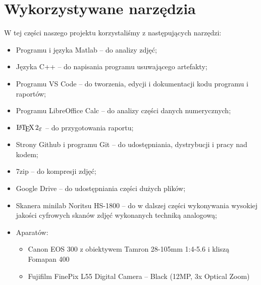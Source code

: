 \documentclass[]{mwart}
\begin{document}
\section{Wykorzystywane narzędzia}
W tej części naszego projektu korzystaliśmy z następujących narzędzi:
\begin{itemize}
    \item Programu i języka Matlab -- do analizy zdjęć;
    \item Języka C++ -- do napisania programu usuwającego artefakty;
    \item Programu VS Code -- do tworzenia, edycji i dokumentacji kodu programu i raportów;
    \item Programu LibreOffice Calc -- do analizy części danych numerycznych;
    \item $\LaTeXe{}$ -- do przygotowania raportu;
    \item Strony Github i programu Git -- do udostępniania, dystrybucji i pracy nad kodem;
    \item 7zip -- do kompresji zdjęć;
    \item Google Drive -- do udostępniania części dużych plików;
    \item Skanera minilab Noritsu HS-1800 -- do w dalszej części wykonywania wysokiej jakości cyfrowych skanów zdjęć wykonanych techniką analogową;
    \item Aparatów:
          \begin{itemize}
              \item Canon EOS 300 z obiektywem Tamron 28-105mm 1:4-5.6 i kliszą Fomapan 400
              \item Fujifilm FinePix L55 Digital Camera -- Black (12MP, 3x Optical Zoom)
          \end{itemize}
\end{itemize}
\end{document}
